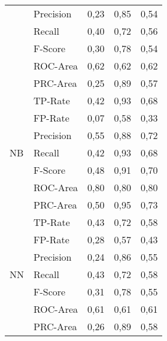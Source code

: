 \documentclass[master,twoside,extern,palatino]{rgseThesis}
\begin{document}
\begin{table}[ht]
{\begin{tabular}{|ll|rrr|}
                     & Precision & 0,23             & 0,85                 & 0,54              \\
                     & Recall    & 0,40             & 0,72                 & 0,56              \\
                     & F-Score   & 0,30             & 0,78                 & 0,54              \\
                     & ROC-Area  & 0,62             & 0,62                 & 0,62              \\
                     & PRC-Area  & 0,25             & 0,89                 & 0,57              \\ 
\hline
\multirow{7}{*}{NB}  & TP-Rate   & 0,42             & 0,93                 & 0,68              \\
                     & FP-Rate   & 0,07             & 0,58                 & 0,33              \\
                     & Precision & 0,55             & 0,88                 & 0,72              \\
                     & Recall    & 0,42             & 0,93                 & 0,68              \\
                     & F-Score   & 0,48             & 0,91                 & 0,70              \\
                     & ROC-Area  & 0,80             & 0,80                 & 0,80              \\
                     & PRC-Area  & 0,50             & 0,95                 & 0,73              \\ 
\hline
\multirow{7}{*}{NN}  & TP-Rate   & 0,43             & 0,72                 & 0,58              \\
                     & FP-Rate   & 0,28             & 0,57                 & 0,43              \\
                     & Precision & 0,24             & 0,86                 & 0,55              \\
                     & Recall    & 0,43             & 0,72                 & 0,58              \\
                     & F-Score   & 0,31             & 0,78                 & 0,55              \\
                     & ROC-Area  & 0,61             & 0,61                 & 0,61              \\
                     & PRC-Area  & 0,26             & 0,89                 & 0,58              \\ 

\end{tabular}}
\end{table}
\end{document}
